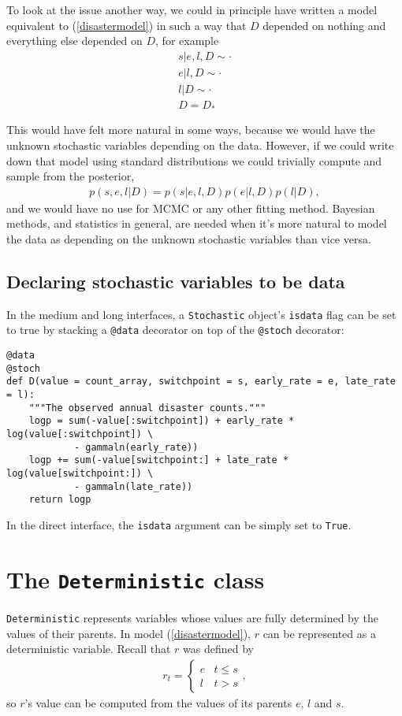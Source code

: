 \medskip
To look at the issue another way, we could in principle have written a model equivalent to (\ref{disastermodel}) in such a way that $D$ depended on nothing and everything else depended on $D$, for example
\begin{eqnarray*}
    s|e,l,D\sim\cdot\\
    e|l,D\sim\cdot\\
    l|D\sim\cdot\\
    D=D_*
\end{eqnarray*}

This would have felt more natural in some ways, because we would have the unknown stochastic variables depending on the data. However, if we could write down that model using standard distributions we could trivially compute and sample from the posterior,
\begin{eqnarray*}
    p(s,e,l|D) = p(s|e, l, D) p(e|l, D) p(l|D),
\end{eqnarray*}
and we would have no use for MCMC or any other fitting method. Bayesian methods, and statistics in general, are needed when it's more natural to model the data as depending on the unknown stochastic variables than vice versa.

\subsection{Declaring stochastic variables to be data}

In the medium and long interfaces, a \texttt{Stochastic} object's \texttt{isdata} flag can be set to true by stacking a \texttt{@data} decorator on top of the \texttt{@stoch} decorator:
\begin{verbatim}
@data
@stoch
def D(value = count_array, switchpoint = s, early_rate = e, late_rate = l):
    """The observed annual disaster counts."""
    logp = sum(-value[:switchpoint]) + early_rate * log(value[:switchpoint]) \
            - gammaln(early_rate))
    logp += sum(-value[switchpoint:] + late_rate * log(value[switchpoint:]) \
            - gammaln(late_rate))
    return logp
\end{verbatim}
In the direct interface, the \texttt{isdata} argument can be simply set to \texttt{True}.


\section{The \texttt{Deterministic} class}\label{dtrm}

\texttt{Deterministic} represents variables whose values are fully determined by the values of their parents. In model (\ref{disastermodel}), $r$ can be represented as a deterministic variable. Recall that $r$ was defined by
\begin{eqnarray*}
    r_t=\left\{\begin{array}{ll}
        e & t\le s\\ l & t>s
        \end{array}\right.,
\end{eqnarray*}
so $r$'s value can be computed from the values of its parents $e$, $l$ and $s$.

